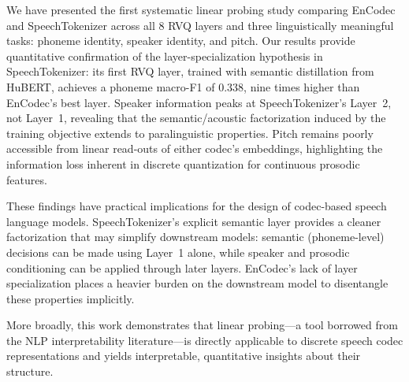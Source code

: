 \documentclass[10pt,twocolumn]{article}
\begin{document}
We have presented the first systematic linear probing study comparing
EnCodec and SpeechTokenizer across all 8 RVQ layers and three
linguistically meaningful tasks: phoneme identity, speaker identity,
and pitch. Our results provide quantitative confirmation of the
layer-specialization hypothesis in SpeechTokenizer: its first RVQ
layer, trained with semantic distillation from HuBERT, achieves a
phoneme macro-F1 of 0.338, nine times higher than EnCodec's best
layer. Speaker information peaks at SpeechTokenizer's Layer~2, not
Layer~1, revealing that the semantic/acoustic factorization induced by
the training objective extends to paralinguistic properties. Pitch
remains poorly accessible from linear read-outs of either codec's
embeddings, highlighting the information loss inherent in discrete
quantization for continuous prosodic features.

These findings have practical implications for the design of
codec-based speech language models. SpeechTokenizer's explicit semantic
layer provides a cleaner factorization that may simplify downstream
models: semantic (phoneme-level) decisions can be made using Layer~1
alone, while speaker and prosodic conditioning can be applied through
later layers. EnCodec's lack of layer specialization places a heavier
burden on the downstream model to disentangle these properties
implicitly.

More broadly, this work demonstrates that linear probing---a tool
borrowed from the NLP interpretability literature---is directly
applicable to discrete speech codec representations and yields
interpretable, quantitative insights about their structure.

\clearpage

\end{document}
